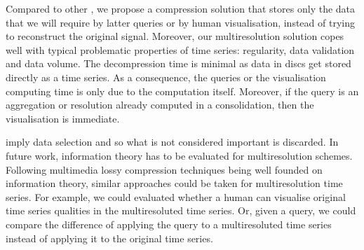 Compared to other , we propose a compression solution that
stores only the data that we will require by latter queries or by
human visualisation, instead of trying to reconstruct the original
signal.  Moreover, our multiresolution solution copes well with
typical problematic properties of time series: regularity, data
validation and data volume.  The decompression time is minimal as data
in discs get stored directly as a time series. As a consequence, the
queries or the visualisation computing time is only due to the
computation itself. Moreover, if the query is an aggregation or
resolution already computed in a  consolidation, then the
visualisation is immediate.


 imply data selection and so what is not considered
important is discarded.  In future work, information theory has to be
evaluated for multiresolution schemes. Following multimedia lossy
compression techniques being well founded on information theory,
similar approaches could be taken for multiresolution time series. For
example, we could evaluated whether a human can visualise original
time series qualities in the multiresoluted time series. Or, given a
query, we could compare the difference of applying the query to a
multiresoluted time series instead of applying it to the original time
series.





